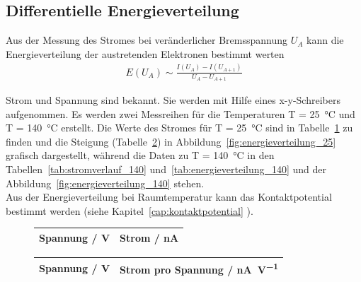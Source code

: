\subsection{Differentielle Energieverteilung} \label{sec:auswertung1}
Aus der Messung des Stromes bei veränderlicher Bremsspannung $U_A$ kann die Energieverteilung der austretenden Elektronen bestimmt werten
\begin{align}
	E(U_A) \sim \frac{I(U_A)-I(U_{A+1})}{U_A - U_{A+1}}
\end{align}

Strom und Spannung sind bekannt. Sie werden mit Hilfe eines x-y-Schreibers aufgenommen. Es werden zwei Messreihen für die Temperaturen T = \SI{25}{\celsius} und T = \SI{140}{\celsius} erstellt. Die Werte des Stromes für T = \SI{25}{\celsius} sind in Tabelle~\ref{tab:stromverlauf_25} zu finden und die Steigung  (Tabelle~\ref{tab:energieverteilung_25}) in Abbildung~\ref{fig:energieverteilung_25} grafisch dargestellt, während die Daten zu T = \SI{140}{\celsius} in den Tabellen~\ref{tab:stromverlauf_140} und~\ref{tab:energieverteilung_140} und der Abbildung~\ref{fig:energieverteilung_140}  stehen. \\
Aus der Energieverteilung bei Raumtemperatur kann das Kontaktpotential bestimmt werden (siehe Kapitel~\ref{cap:kontaktpotential} ).




\begin{figure}
	\centering
	\begin{tabular}{cc}
		Spannung / \si{\volt} & Strom /  \si{\nano\ampere}   \\
		\hline
		
	\end{tabular}
	\label{tab:stromverlauf_25}
\end{figure}

\begin{figure}
	\centering
	\begin{tabular}{cc}
		Spannung / \si{\volt} & Strom pro Spannung / \si{\nano\ampere\per\volt}   \\
		\hline
		
	\end{tabular}
	\label{tab:energieverteilung_25}
\end{figure}


